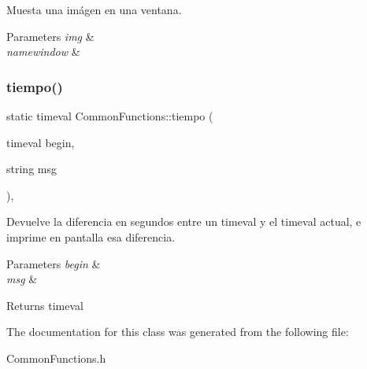 Muesta una imágen en una ventana. 


\begin{DoxyParams}{Parameters}
{\em img} & \\
\hline
{\em namewindow} & \\
\hline
\end{DoxyParams}
\mbox{\label{classCommonFunctions_a72ec70e251bf9b34409318b71e55d34e}} 
\subsubsection{\texorpdfstring{tiempo()}{tiempo()}}
{\footnotesize\ttfamily static timeval Common\+Functions\+::tiempo (\begin{DoxyParamCaption}\item[{timeval}]{begin,  }\item[{string}]{msg }\end{DoxyParamCaption})\hspace{0.3cm}{\ttfamily [inline]}, {\ttfamily [static]}}



Devuelve la diferencia en segundos entre un timeval y el timeval actual, e imprime en pantalla esa diferencia. 


\begin{DoxyParams}{Parameters}
{\em begin} & \\
\hline
{\em msg} & \\
\hline
\end{DoxyParams}
\begin{DoxyReturn}{Returns}
timeval 
\end{DoxyReturn}


The documentation for this class was generated from the following file\+:\begin{DoxyCompactItemize}
\item 
Common\+Functions.\+h\end{DoxyCompactItemize}
